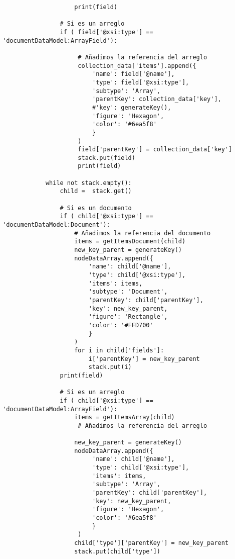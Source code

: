 \begin{code}
\begin{verbatim}
                    print(field)
                
                # Si es un arreglo
                if ( field['@xsi:type'] == 'documentDataModel:ArrayField'):
                    
                     # Añadimos la referencia del arreglo
                     collection_data['items'].append({ 
                         'name': field['@name'],
                         'type': field['@xsi:type'],
                         'subtype': 'Array',
                         'parentKey': collection_data['key'], 
                         #'key': generateKey(),
                         'figure': 'Hexagon',
                         'color': '#6ea5f8'
                         }
                     )
                     field['parentKey'] = collection_data['key']
                     stack.put(field)
                     print(field)         
            
            while not stack.empty():
                child =  stack.get()
                
                # Si es un documento
                if ( child['@xsi:type'] == 'documentDataModel:Document'):
                    # Añadimos la referencia del documento
                    items = getItemsDocument(child)
                    new_key_parent = generateKey()
                    nodeDataArray.append({ 
                        'name': child['@name'],
                        'type': child['@xsi:type'],
                        'items': items,
                        'subtype': 'Document',
                        'parentKey': child['parentKey'],
                        'key': new_key_parent,
                        'figure': 'Rectangle',
                        'color': '#FFD700'
                        }
                    )
                    for i in child['fields']:
                        i['parentKey'] = new_key_parent
                        stack.put(i)
                print(field)
                
                # Si es un arreglo
                if ( child['@xsi:type'] == 'documentDataModel:ArrayField'):  
                    items = getItemsArray(child)
                     # Añadimos la referencia del arreglo
    
                    new_key_parent = generateKey()
                    nodeDataArray.append({ 
                         'name': child['@name'],
                         'type': child['@xsi:type'],
                         'items': items,
                         'subtype': 'Array',
                         'parentKey': child['parentKey'],
                         'key': new_key_parent,
                         'figure': 'Hexagon',
                         'color': '#6ea5f8'
                         }
                     )
                    child['type']['parentKey'] = new_key_parent
                    stack.put(child['type'])
    

\end{verbatim}
\end{code}
